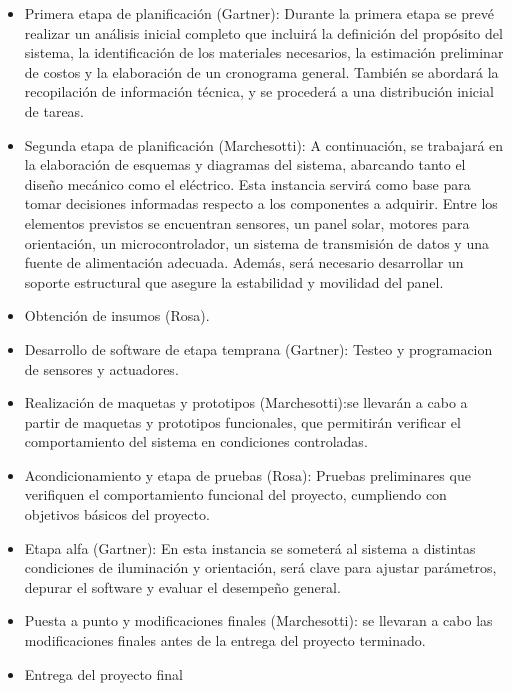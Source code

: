 \documentclass[a4paper,12pt]{article}
\begin{document}
\begin{itemize}
    \item Primera etapa de planificación (Gartner): Durante la primera etapa se prevé realizar un análisis inicial completo que incluirá la definición del propósito del sistema, la identificación de los materiales necesarios, la estimación preliminar de costos y la elaboración de un cronograma general. También se abordará la recopilación de información técnica, y se procederá a una distribución inicial de tareas.
    \item Segunda etapa de planificación (Marchesotti): A continuación, se trabajará en la elaboración de esquemas y diagramas del sistema, abarcando tanto el diseño mecánico como el eléctrico. Esta instancia servirá como base para tomar decisiones informadas respecto a los componentes a adquirir. Entre los elementos previstos se encuentran sensores, un panel solar, motores para orientación, un microcontrolador, un sistema de transmisión de datos y una fuente de alimentación adecuada. Además, será necesario desarrollar un soporte estructural que asegure la estabilidad y movilidad del panel.
    \item Obtención de insumos (Rosa).
    \item Desarrollo de software de etapa temprana (Gartner): Testeo y programacion de sensores y actuadores.
    \item Realización de maquetas y prototipos (Marchesotti):se llevarán a cabo a partir de maquetas y prototipos funcionales, que permitirán verificar el comportamiento del sistema en condiciones controladas.
    \item Acondicionamiento y etapa de pruebas (Rosa): Pruebas preliminares que verifiquen el comportamiento funcional del proyecto, cumpliendo con objetivos básicos del proyecto. 
    \item Etapa alfa (Gartner): En esta instancia se someterá al sistema a distintas condiciones de iluminación y orientación, será clave para ajustar parámetros, depurar el software y evaluar el desempeño general.
    \item Puesta a punto y modificaciones finales (Marchesotti): se llevaran a cabo las modificaciones finales antes de la entrega del proyecto terminado.
    \item Entrega del proyecto final
\end{itemize}
\end{document}
